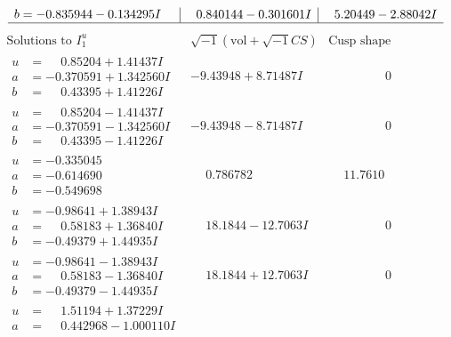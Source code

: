 \documentclass[1p]{elsarticle_modified}
\theoremstyle{definition}
\newcommand{\I}{\sqrt{-1}}
\begin{document}
$$\begin{array}{c|c|c}
\begin{aligned}
b &= -0.835944 - 0.134295 I\end{aligned}
 & \phantom{-}0.840144 - 0.301601 I & \phantom{-}5.20449 - 2.88042 I\\
 \hline 
 \end{array}$$\newpage$$\begin{array}{c|c|c}  
\text{Solutions to }I^u_{1}& \I (\text{vol} + \sqrt{-1}CS) & \text{Cusp shape}\\
 \hline 
\begin{aligned}
u &= \phantom{-}0.85204 + 1.41437 I \\
a &= -0.370591 + 1.342560 I \\
b &= \phantom{-}0.43395 + 1.41226 I\end{aligned}
 & -9.43948 + 8.71487 I & \phantom{-0.000000 } 0 \\ \hline\begin{aligned}
u &= \phantom{-}0.85204 - 1.41437 I \\
a &= -0.370591 - 1.342560 I \\
b &= \phantom{-}0.43395 - 1.41226 I\end{aligned}
 & -9.43948 - 8.71487 I & \phantom{-0.000000 } 0 \\ \hline\begin{aligned}
u &= -0.335045\phantom{ +0.000000I} \\
a &= -0.614690\phantom{ +0.000000I} \\
b &= -0.549698\phantom{ +0.000000I}\end{aligned}
 & \phantom{-}0.786782\phantom{ +0.000000I} & \phantom{-}11.7610\phantom{ +0.000000I} \\ \hline\begin{aligned}
u &= -0.98641 + 1.38943 I \\
a &= \phantom{-}0.58183 + 1.36840 I \\
b &= -0.49379 + 1.44935 I\end{aligned}
 & \phantom{-}18.1844 - 12.7063 I & \phantom{-0.000000 } 0 \\ \hline\begin{aligned}
u &= -0.98641 - 1.38943 I \\
a &= \phantom{-}0.58183 - 1.36840 I \\
b &= -0.49379 - 1.44935 I\end{aligned}
 & \phantom{-}18.1844 + 12.7063 I & \phantom{-0.000000 } 0 \\ \hline\begin{aligned}
u &= \phantom{-}1.51194 + 1.37229 I \\
a &= \phantom{-}0.442968 - 1.000110 I \\

\end{aligned}
\end{array}$$
\end{document}

